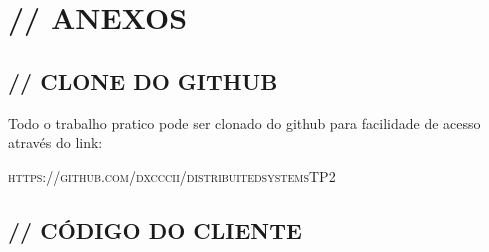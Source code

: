 \documentclass[12pt]{article}
\begin{document}
\begin{enumerate}
\begin{verbatim}
\end{verbatim}
\end{enumerate}

\section{// ANEXOS}
\subsection{// CLONE DO GITHUB}
Todo o trabalho pratico pode ser clonado do github para facilidade de acesso através do link:

\begin{center}
\Large{
\Large{\textsc{https://github.com/dxcccii/distribuitedsystemsTP2}}}\\
\end{center}

\subsection{// CÓDIGO DO CLIENTE}
\end{document}
